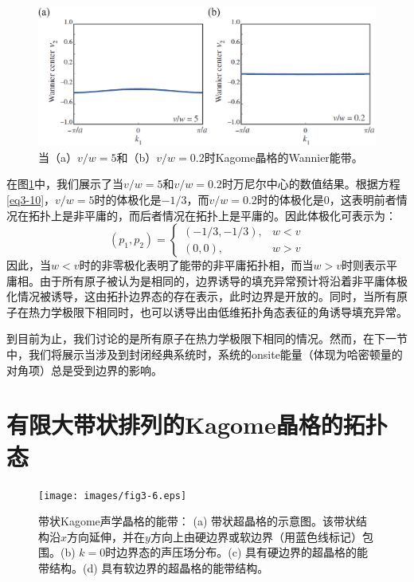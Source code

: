 \begin{figure}[h!]
  \centering
  \includegraphics[width=1\textwidth]{images/fig3-5.eps} 
  \caption{当（a）\(v/w = 5\)和（b）\(v/w = 0.2\)时Kagome晶格的Wannier能带。
  }
  \label{fig_3_5}
\end{figure}

在图\ref{fig_3_5}中，我们展示了当\(v/w = 5\)和\(v/w = 0.2\)时万尼尔中心的数值结果。根据方程\ref{eq3-10}，\(v/w = 5\)时的体极化是\(-1/3\)，而\(v/w = 0.2\)时的体极化是\(0\)，这表明前者情况在拓扑上是非平庸的，而后者情况在拓扑上是平庸的。因此体极化可表示为：
\begin{equation} \label{eq3-11}
  (p_1,p_2) = 
  \begin{cases}
  (-1/3,-1/3), & w < v \\
  (0,0), & w > v
  \end{cases}
\end{equation}
因此，当$w < v$时的非零极化表明了能带的非平庸拓扑相，而当$w > v$时则表示平庸相。由于所有原子被认为是相同的，边界诱导的填充异常预计将沿着非平庸体极化情况被诱导，这由拓扑边界态的存在表示，此时边界是开放的。同时，当所有原子在热力学极限下相同时，也可以诱导出由低维拓扑角态表征的角诱导填充异常\cite{C3-3}。

到目前为止，我们讨论的是所有原子在热力学极限下相同的情况。然而，在下一节中，我们将展示当涉及到封闭经典系统时，系统的onsite能量（体现为哈密顿量的对角项）总是受到边界的影响。

\section{有限大带状排列的Kagome晶格的拓扑态}

\begin{figure}[h!]
  \centering
  \texttt{[image: images/fig3-6.eps]} 
  \caption{带状Kagome声学晶格的能带：
  (a) 带状超晶格的示意图。该带状结构沿$x$方向延伸，并在$y$方向上由硬边界或软边界（用蓝色线标记）包围。(b) $k = 0$时边界态的声压场分布。(c) 具有硬边界的超晶格的能带结构。(d) 具有软边界的超晶格的能带结构。
  }
  \label{fig_3_6}
\end{figure}

